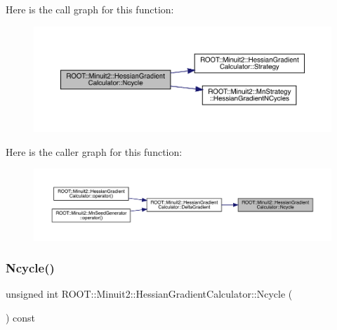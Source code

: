 Here is the call graph for this function\+:\nopagebreak
\begin{figure}[H]
\begin{center}
\leavevmode
\includegraphics[width=350pt]{dc/d17/classROOT_1_1Minuit2_1_1HessianGradientCalculator_a234641f72296f007b2d95b514be07138_cgraph}
\end{center}
\end{figure}
Here is the caller graph for this function\+:\nopagebreak
\begin{figure}[H]
\begin{center}
\leavevmode
\includegraphics[width=350pt]{dc/d17/classROOT_1_1Minuit2_1_1HessianGradientCalculator_a234641f72296f007b2d95b514be07138_icgraph}
\end{center}
\end{figure}
\mbox{\label{classROOT_1_1Minuit2_1_1HessianGradientCalculator_a234641f72296f007b2d95b514be07138}} 
\subsubsection{\texorpdfstring{Ncycle()}{Ncycle()}\hspace{0.1cm}{\footnotesize\ttfamily [2/2]}}
{\footnotesize\ttfamily unsigned int R\+O\+O\+T\+::\+Minuit2\+::\+Hessian\+Gradient\+Calculator\+::\+Ncycle (\begin{DoxyParamCaption}{ }\end{DoxyParamCaption}) const}

